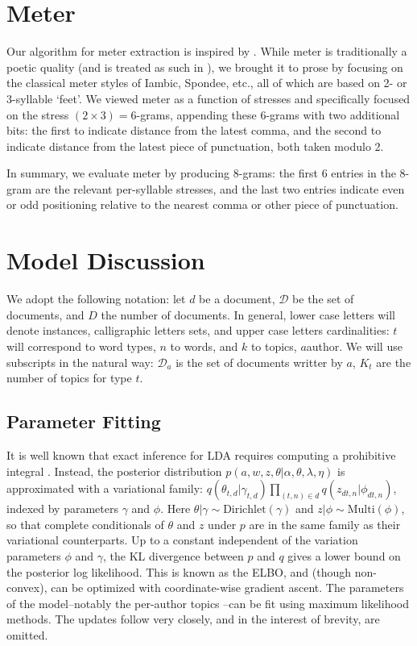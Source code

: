\documentclass[14pt]{article} %
\theoremstyle{plain}
\theoremstyle{definition}
\theoremstyle{remark}
\begin{document}
\begin{appendix}


\section{Meter}
\label{appendix:meter}

Our algorithm for meter extraction is inspired by \citet{Genzel}. While meter is traditionally a poetic quality (and is treated as such in \citep{Genzel}), we brought it to prose by focusing on the classical meter styles of Iambic, Spondee, etc., all of which are based on 2- or 3-syllable `feet'. We viewed meter as a function of stresses and specifically focused on the stress $(2\times3)=6$-grams, appending these $6$-grams with two additional bits: the first to indicate distance from the latest comma, and the second to indicate distance from the latest piece of punctuation, both taken modulo 2.

In summary, we evaluate meter by producing $8$-grams: the first $6$ entries in the $8$-gram are the relevant per-syllable stresses, and the last two entries indicate even or odd positioning relative to the nearest comma or other piece of punctuation.

\section{Model Discussion}
\label{appendix:model}

We adopt the following notation: let $d$ be a document, $\mathcal{D}$ be the set of documents, and $D$ the number of documents. In general, lower case letters will denote instances, calligraphic letters sets, and upper case letters cardinalities: $t$ will correspond to word types, $n$ to words, and $k$ to topics, $a$author. We will use subscripts in the natural way: $\mathcal{D}_a$ is the set of documents writter by $a$, $K_t$ are the number of topics for type $t$.

\subsection{Parameter Fitting}
\label{appendix:parameter_fitting}

It is well known that exact inference for LDA requires computing a prohibitive integral \cite{Blei2003}. Instead, the posterior distribution $p(a,w,z,\theta|\alpha,\theta,\lambda,\eta)$ is approximated with a variational family: $q(\theta_{t,d}|\gamma_{t,d})\prod_{(t,n)\in d}q(z_{dt,n}|\phi_{dt,n})$, indexed by parameters $\gamma$ and $\phi$. Here $\theta|\gamma \sim\text{Dirichlet}(\gamma)$ and $z|\phi \sim\text{Multi}(\phi)$, so that complete conditionals of $\theta$ and $z$ under $p$ are in the same family as their variational counterparts. Up to a constant independent of the variation parameters $\phi$ and $\gamma$, the KL divergence between $p$ and $q$ gives a lower bound on the posterior log likelihood. This is known as the ELBO, and (though non-convex), can be optimized with coordinate-wise gradient ascent. The parameters of the model--notably the per-author topics --can be fit using maximum likelihood methods. The updates follow \cite{wang2009simultaneous} very closely, and in the interest of brevity, are omitted.


\end{appendix}
\end{document}
